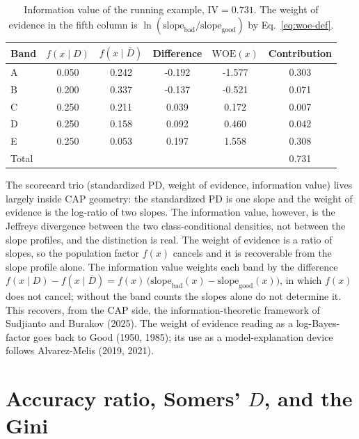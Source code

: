 \documentclass[12pt]{article}
\newcommand{\slope}{\mathrm{slope}}
\newcommand{\WOE}{\mathrm{WOE}}
\newcommand{\IV}{\mathrm{IV}}
\begin{document}
\begin{table}[htbp]
\centering
\small
\begin{tabular}{l S[table-format=1.3] S[table-format=1.3]
  S[table-format=-1.3] S[table-format=-1.3] S[table-format=1.3]}
\toprule
Band & {$f(x\mid D)$} & {$f(x\mid\bar D)$} & {Difference} & {$\WOE(x)$} & {Contribution}\\
\midrule
A & 0.050 & 0.242 & -0.192 & -1.577 & 0.303 \\
B & 0.200 & 0.337 & -0.137 & -0.521 & 0.071 \\
C & 0.250 & 0.211 &  0.039 &  0.172 & 0.007 \\
D & 0.250 & 0.158 &  0.092 &  0.460 & 0.042 \\
E & 0.250 & 0.053 &  0.197 &  1.558 & 0.308 \\
\midrule
Total & & & & & 0.731 \\
\bottomrule
\end{tabular}
\caption{Information value of the running example, $\IV=0.731$. The weight of evidence in the
fifth column is $\ln(\slope_{\text{bad}}/\slope_{\text{good}})$ by Eq.~\eqref{eq:woe-def}.}
\label{tab:iv}
\end{table}

The scorecard trio (standardized PD, weight of evidence, information value) lives largely inside
CAP geometry: the standardized PD is one slope and the weight of evidence is the log-ratio of two
slopes. The information value, however, is the Jeffreys divergence between the two
class-conditional densities, not between the slope profiles, and the distinction is real. The
weight of evidence is a ratio of slopes, so the population factor $f(x)$ cancels and it is
recoverable from the slope profile alone. The information value weights each band by the
difference $f(x\mid D)-f(x\mid\bar D)=f(x)\,\bigl(\slope_{\text{bad}}(x)-\slope_{\text{good}}(x)\bigr)$,
in which $f(x)$ does not cancel; without the band counts the slopes alone do not determine it.
This recovers, from the CAP side, the information-theoretic framework of Sudjianto
and Burakov (2025). The weight of evidence reading as a log-Bayes-factor goes back to
Good (1950, 1985); its use as a model-explanation device follows Alvarez-Melis (2019, 2021).

\section{Accuracy ratio, Somers' \texorpdfstring{$D$}{D}, and the Gini}\label{sec:somers}
\end{document}
